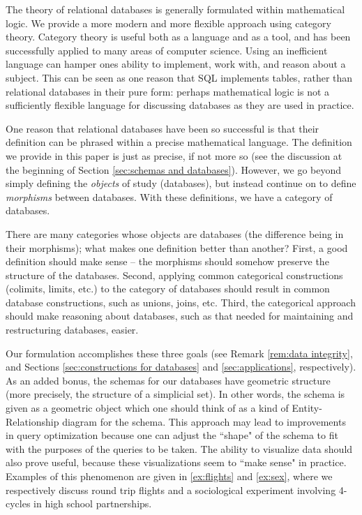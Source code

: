 \documentclass{amsart}
\begin{document}
The theory of relational databases is generally formulated within mathematical logic.  We provide a more modern and more flexible approach using category theory.  Category theory is useful both as a language and as a tool, and has been successfully applied to many areas of computer science.  Using an inefficient language can hamper ones ability to implement, work with, and reason about a subject.  This can be seen as one reason that SQL implements tables, rather than relational databases in their pure form: perhaps mathematical logic is not a sufficiently flexible language for discussing databases as they are used in practice.

One reason that relational databases have been so successful is that their definition can be phrased within a precise mathematical language.  The definition we provide in this paper is just as precise, if not more so (see the discussion at the beginning of Section \ref{sec:schemas and databases}).  However, we go beyond simply defining the {\em objects} of study (databases), but instead continue on to define {\em morphisms} between databases.  With these definitions, we have a category of databases.

There are many categories whose objects are databases (the difference being in their morphisms); what makes one definition better than another?  First, a good definition should make sense -- the morphisms should somehow preserve the structure of the databases.  Second, applying common categorical constructions (colimits, limits, etc.) to the category of databases should result in common database constructions, such as unions, joins, etc.  Third, the categorical approach should make reasoning about databases, such as that needed for maintaining and restructuring databases, easier.  

Our formulation accomplishes these three goals (see Remark \ref{rem:data integrity}, and Sections \ref{sec:constructions for databases} and \ref{sec:applications}, respectively).  As an added bonus, the schemas for our databases have geometric structure (more precisely, the structure of a simplicial set).  In other words, the schema is given as a geometric object which one should think of as a kind of Entity-Relationship diagram for the schema.  This approach may lead to improvements in query optimization because one can adjust the ``shape" of the schema to fit with the purposes of the queries to be taken.  The ability to visualize data should also prove useful, because these visualizations seem to ``make sense" in practice.  Examples of this phenomenon are given in \ref{ex:flights} and \ref{ex:sex}, where we respectively discuss round trip flights and a sociological experiment involving 4-cycles in high school partnerships.
\end{document}
